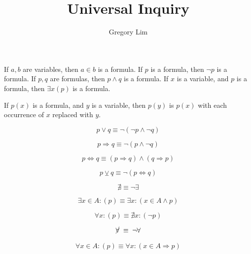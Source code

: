 \documentclass{main}
\title{Universal Inquiry}
\author{Gregory Lim}
\date{}
\begin{document}
\begin{metadefinition}[Formula]
	If $a,b$ are variables,
	then $a\in b$ is a formula.
	If $p$ is a formula,
	then $\neg p$ is a formula.
	If $p,q$ are formulas,
	then $p\land q$ is a formula.
	If $x$ is a variable,
	and $p$ is a formula,
	then $\exists x(p)$ is a formula.
\end{metadefinition}

\begin{metadefinition}
	If $p(x)$ is a formula,
	and $y$ is a variable,
	then $p(y)$ is $p(x)$ with each occurrence of $x$ replaced with $y$.
\end{metadefinition}

\begin{notation}[Disjunction]
$$
	p\lor q
	\equiv
	\neg(\neg p\land\neg q)
$$
\end{notation}

\begin{notation}[Implication]
$$
	p\Rightarrow q
	\equiv
	\neg(p\land\neg q)
$$
\end{notation}

\begin{notation}[Equivalence]
$$
	p\Leftrightarrow q
	\equiv
	(p\Rightarrow q)
	\land
	(q\Rightarrow p)
$$
\end{notation}

\begin{notation}
$$
	p\veebar q
	\equiv
	\neg(p\Leftrightarrow q)
$$
\end{notation}

\begin{notation}
$$
	\nexists
	\equiv
	\neg\exists
$$
\end{notation}

\begin{notation}
$$
	\exists x\in A:(p)
	\equiv
	\exists x:(x\in A\land p)
$$
\end{notation}

\begin{notation}
$$
	\forall x:(p)
	\equiv
	\nexists x:(\neg p)
$$
\end{notation}

\begin{notation}
$$
	\nforall
	\equiv
	\neg\forall
$$
\end{notation}

\begin{notation}
$$
	\forall x\in A:(p)
	\equiv
	\forall x:(x\in A\Rightarrow p)
$$
\end{notation}
\end{document}
